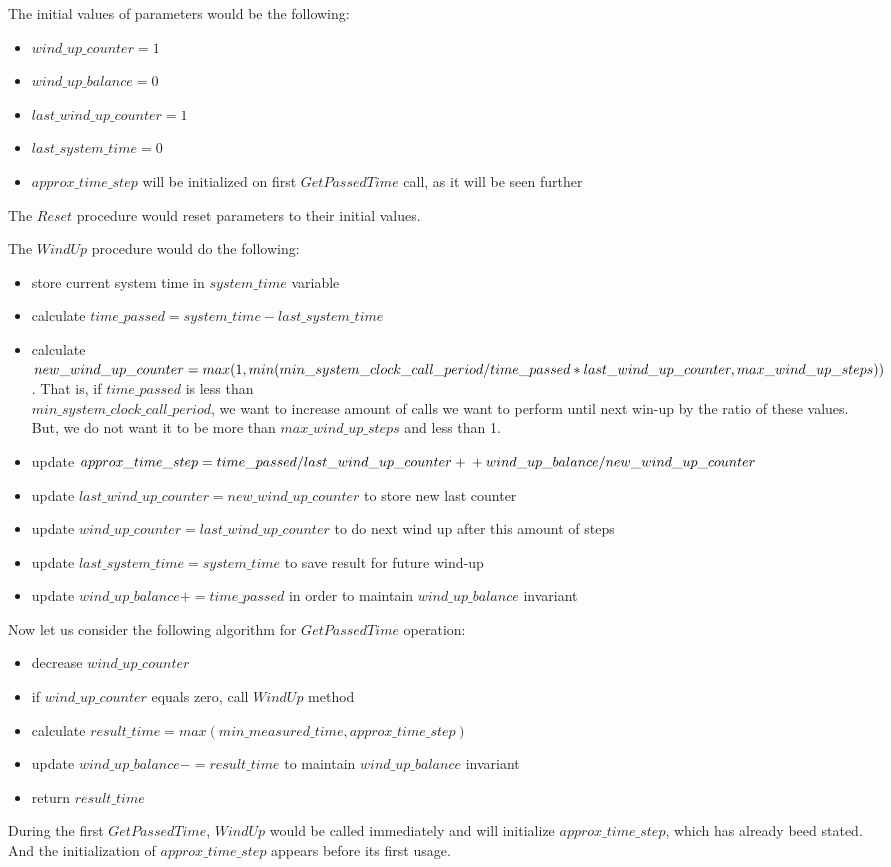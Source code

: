 \documentclass{article}
\begin{document}
The initial values of parameters would be the following:
\begin{itemize}
	\item $wind\_up\_counter = 1$
	\item $wind\_up\_balance = 0$
	\item $last\_wind\_up\_counter = 1$
	\item $last\_system\_time = 0$
	\item $approx\_time\_step$ will be initialized on first $GetPassedTime$ call, as it will be seen further
\end{itemize}

The $Reset$ procedure would reset parameters to their initial values.

The $WindUp$ procedure would do the following:
\begin{itemize}
	\item store current system time in $system\_time$ variable
	\item calculate $time\_passed = system\_time - last\_system\_time$
	\item calculate $new\_wind\_up\_counter = max(1, \\min(min\_system\_clock\_call\_period / time\_passed * last\_wind\_up\_counter,\\ max\_wind\_up\_steps))$. That is, if $time\_passed$ is less than \\$min\_system\_clock\_call\_period$, we want to increase amount of calls we want to perform until next win-up by the ratio of these values. But, we do not want it to be more than $max\_wind\_up\_steps$ and less than 1.
	\item update $approx\_time\_step = time\_passed / last\_wind\_up\_counter +\\+ wind\_up\_balance / new\_wind\_up\_counter$
	\item update $last\_wind\_up\_counter = new\_wind\_up\_counter$ to store new last counter
	\item update $wind\_up\_counter = last\_wind\_up\_counter$ to do next wind up after this amount of steps
	\item update $last\_system\_time = system\_time$ to save result for future wind-up
	\item update $wind\_up\_balance += time\_passed$ in order to maintain $wind\_up\_balance$ invariant
\end{itemize}
Now let us consider the following algorithm for $GetPassedTime$ operation:
\begin{itemize}
	\item decrease $wind\_up\_counter$
	\item if $wind\_up\_counter$ equals zero, call $WindUp$ method
	\item calculate $result\_time = max(min\_measured\_time, approx\_time\_step)$
	\item update $wind\_up\_balance -= result\_time$ to maintain $wind\_up\_balance$ invariant
	\item return $result\_time$
\end{itemize}
During the first $GetPassedTime$, $WindUp$ would be called immediately and will initialize $approx\_time\_step$, which has already beed stated. And the initialization of $approx\_time\_step$ appears before its first usage.
\end{document}
